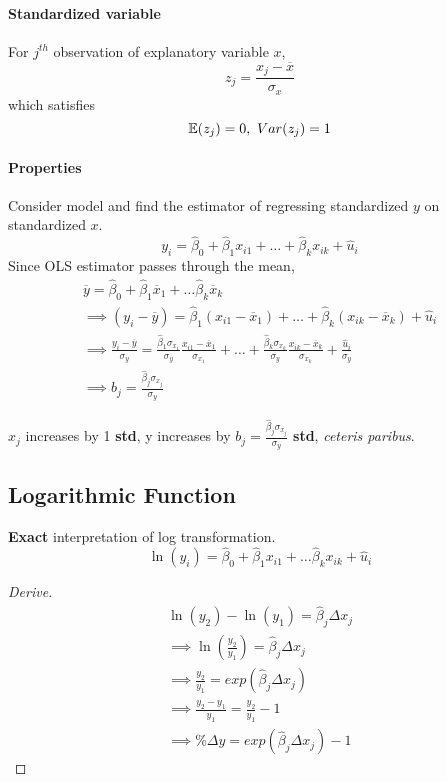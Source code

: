 \documentclass[]{article}
\begin{document}
    			\paragraph{Standardized variable} For $j^{th}$ observation of explanatory variable $x$, 
    				\[
    					z_j = \frac{x_j - \overline{x}}{\sigma_{x}}
    				\]
    				which satisfies
    				\[
    					\mathbb{E}({z_j}) = 0,\ Var(z_j) = 1
    				\]
    			\paragraph{Properties} Consider model and find the estimator of regressing standardized $y$ on standardized $x$.
    				\[
    					y_i = \hat{\beta}_0 + \hat{\beta}_1 x_{i1} + \dots + \hat{\beta}_k x_{ik} + \hat{u}_i
    				\]
    				Since OLS estimator passes through the mean,
    				\begin{gather*}
    					\overline{y} = \hat{\beta}_0 + \hat{\beta}_1 \overline{x}_1 + \dots \hat{\beta}_k \overline{x}_k \\
    					\implies (y_i - \overline{y}) = \hat{\beta}_1 (x_{i1} - \overline{x}_1) + \dots + \hat{\beta}_k (x_{ik} - \overline{x}_k) + \hat{u}_i \\
    					\implies \frac{y_i - \overline{y}}{\sigma_y} = 
    					\frac{\hat{\beta}_1 \sigma_{x_1}}{\sigma_y} \frac{x_{i1} - \overline{x}_1}{\sigma_{x_1}} + \dots + 
    					\frac{\hat{\beta}_k \sigma_{x_k}}{\sigma_y} \frac{x_{ik} - \overline{x}_k}{\sigma_{x_k}} + \frac{\hat{u}_i}{\sigma_y} \\
    					\implies b_j = \frac{\hat{\beta}_j \sigma_{x_j}}{\sigma_y}
    				\end{gather*}
    			\begin{remark}[Interpretation]
    				$x_j$ increases by 1 \textbf{std}, y increases by $b_j = \frac{\hat{\beta}_j \sigma_{x_j}}{\sigma_y}$ \textbf{std}, \emph{ceteris paribus}.
    			\end{remark}
    	\subsection{Logarithmic Function}
    		\par \textbf{Exact} interpretation of log transformation.
    			\[
    				\ln(y_i) = \hat{\beta}_0 + \hat{\beta}_1 x_{i1} + \dots \hat{\beta}_k x_{ik} + \hat{u}_i
    			\]
    			\begin{proof}[Derive]
	    			\begin{gather*}
	    				\ln(y_2) - \ln(y_1) = \hat{\beta}_j \Delta x_j \\
	    				\implies \ln(\frac{y_2}{y_1}) = \hat{\beta}_j \Delta x_j \\
	    				\implies \frac{y_2}{y_1} = exp(\hat{\beta}_j \Delta x_j) \\
	    				\implies \frac{y_2 - y_1}{y_1} 
	    				= \frac{y_2}{y_1} - 1 \\
	    				\implies \%\Delta y= exp(\hat{\beta}_j \Delta x_j) - 1
	    			\end{gather*}
    			\end{proof}
\end{document}
